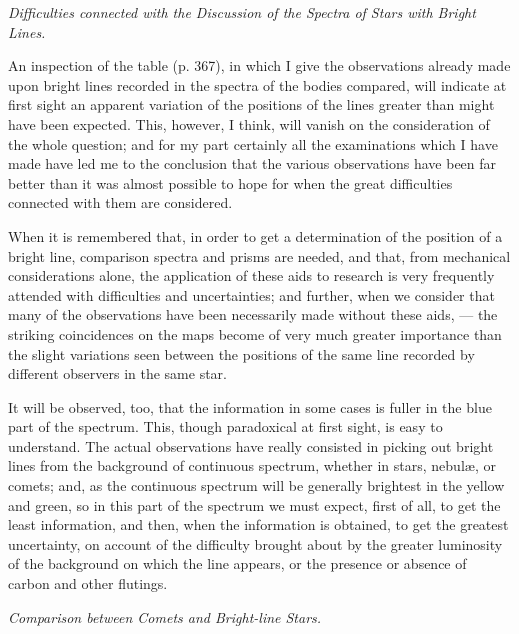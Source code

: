 \documentclass[a4paper, 12pt, oneside, polutonikogreek, english]{article}
\begin{document}
\emph{Difficulties connected with the Discussion of the Spectra of Stars with Bright Lines.}

An inspection of the table (p. 367), in which I give the observations already made upon bright lines recorded in the spectra of the bodies compared, will indicate at first sight an apparent variation of the positions of the lines greater than might have been expected. This, however, I think, will vanish on the consideration of the whole question; and for my part certainly all the examinations which I have made have led me to the conclusion that the various observations have been far better than it was almost possible to hope for when the great difficulties connected with them are considered.

When it is remembered that, in order to get a determination of the position of a bright line, comparison spectra and prisms are needed, and that, from mechanical considerations alone, the application of these aids to research is very frequently attended with difficulties and uncertainties; and further, when we consider that many of the observations have been necessarily made without these aids, --- the striking coincidences on the maps become of very much greater importance than the slight variations seen between the positions of the same line recorded by different observers in the same star.

It will be observed, too, that the information in some cases is fuller in the blue part of the spectrum. This, though paradoxical at first sight, is easy to understand. The actual observations have really consisted in picking out bright lines from the background of continuous spectrum, whether in stars, nebulæ, or comets; and, as the continuous spectrum will be generally brightest in the yellow and green, so in this part of the spectrum we must expect, first of all, to get the least information, and then, when the information is obtained, to get the greatest uncertainty, on account of the difficulty brought about by the greater luminosity of the background on which the line appears, or the presence or absence of carbon and other flutings.

\emph{Comparison between Comets and Bright-line Stars.}
\end{document}
